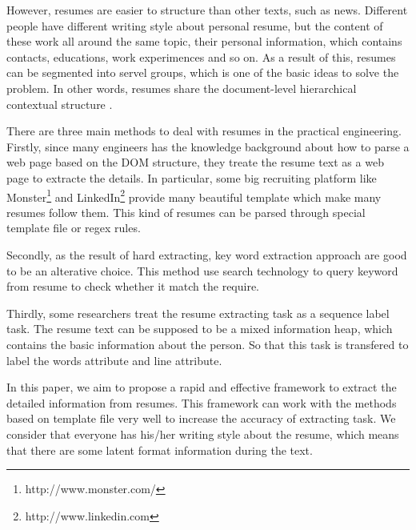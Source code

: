 \documentclass{acm_proc_article-sp}
\begin{document}
However, resumes are easier to structure than other texts, such as news. 
Different people have different writing style about personal resume, but the content of these work all around the same topic, their personal information, which contains contacts, educations, work experimences and so on.
As a result of this, resumes can be segmented into servel groups, which is one of the basic ideas to solve the problem.
In other words, resumes share the document-level hierarchical contextual structure \cite{maheshwari2010approach}.

There are three main methods to deal with resumes in the practical engineering. 
Firstly, since many engineers has the knowledge background about how to parse a web page based on the DOM structure, they treate the resume text as a web page to extracte the details. 
In particular, some big recruiting platform like Monster\footnote{http://www.monster.com/} and LinkedIn\footnote{http://www.linkedin.com} provide many beautiful template which make many resumes follow them.
This kind of resumes can be parsed through special template file or regex rules.

Secondly, as the result of hard extracting, key word extraction approach are good to be an alterative choice.
This method use search technology to query keyword from resume to check whether it match the require.

Thirdly, some researchers treat the resume extracting task as a sequence label task.
The resume text can be supposed to be a mixed information heap, which contains the basic information about the person.
So that this task is transfered to label the words attribute and line attribute.


In this paper, we aim to propose a rapid and effective framework to extract the detailed information from resumes. 
This framework can work with the methods based on template file very well to increase the accuracy of extracting task.
We consider that everyone has his/her writing style about the resume, which means that there are some latent format information during the text.
\end{document}
